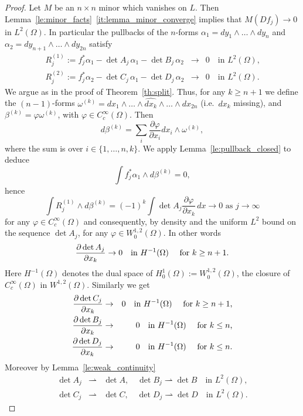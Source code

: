 \documentclass[titlepage]{amsart}
\numberwithin{equation}{section}
\theoremstyle{plain}
\theoremstyle{definition}
\theoremstyle{remark}
\begin{document}
\begin{proof} Let $M$ be an $n \times n$ minor which vanishes on $L$. Then 
Lemma~\ref{le:minor_facts}~\eqref{it:lemma_minor_converge} implies that 
$M(Df_j) \to 0$ in $L^2(\Omega)$. In particular the pullbacks of the $n$-forms 
$\alpha_1 = dy_1 \wedge \ldots \wedge dy_n$ and 
$\alpha_2 = dy_{n+1} \wedge \ldots \wedge dy_{2n}$ satisfy
\begin{eqnarray*}
 R^{(1)}_j := f_j^* \alpha_1 - \det A_j \,  \alpha_1 - \det B_j \,  \alpha_2 &\to& 0 \quad \text{in $L^2(\Omega)$,} \\
 R^{(2)}_j := f_j^* \alpha_2 - \det C_j \,  \alpha_1 - \det D_j \,  \alpha_2 &\to& 0 \quad \text{in $L^2(\Omega)$.}
 \end{eqnarray*}
 We argue as in the proof of Theorem~\ref{th:split}. Thus, for any $k\geq n+1$ we define the $(n-1)$-forms $\omega^{(k)}=dx_1\wedge\dots\wedge\widehat{dx_k}\wedge\dots\wedge dx_{2n}$ (i.e.~$dx_{k}$ missing), and $\beta^{(k)}=\varphi\omega^{(k)}$, with $\varphi\in C_c^\infty(\Omega)$. Then 
 $$
 d\beta^{(k)}=\sum_i\frac{\partial\varphi}{\partial x_i}dx_i\wedge\omega^{(k)},
 $$
 where the sum is over $i\in\{1,\dots,n,k\}$. We apply Lemma~\ref{le:pullback_closed} to deduce 
 $$
 \int f_j^*\alpha_1\wedge d\beta^{(k)}=0,
 $$
 hence
 $$
\int R_j^{(1)}\wedge d\beta^{(k)}=(-1)^k\int \det A_j\frac{\partial\varphi}{\partial x_k}\,dx\to 0\textrm{ as }j\to\infty
 $$
 for any $\varphi\in C_c^\infty(\Omega)$ and consequently, by density and the uniform $L^2$ bound on the sequence $\det A_j$, for any 
 $\varphi \in W^{1,2}_0(\Omega)$. 
 In other words
 \begin{equation}  \label{eq:H-1_A}
 \frac{\partial \det A_j}{\partial x_k} \to 0 \quad \text{in $H^{-1}(\Omega)$ \quad  for $k \ge n+1$.}
 \end{equation} 
 Here $H^{-1}(\Omega)$ denotes the  dual space of $H^1_0(\Omega) := W^{1,2}_0(\Omega)$, the closure of $C_c^\infty(\Omega)$
 in $W^{1,2}(\Omega)$. 
 Similarly we get
\begin{eqnarray}
 \frac{\partial \det C_j}{\partial x_k}  &\to& 0 \quad \text{in $H^{-1}(\Omega)$ \quad  for $k \ge n+1$,} \\
  \frac{\partial \det B_j}{\partial x_k}  &\to& 0 \quad \text{in $H^{-1}(\Omega)$ \quad  for $k \le n$,}\\
   \frac{\partial \det D_j}{\partial x_k}  &\to& 0 \quad \text{in $H^{-1}(\Omega)$ \quad  for $k \le n$.}   \label{eq:H-1_D}
 \end{eqnarray}
 Moreover by Lemma~\ref{le:weak_continuity} 
 \begin{eqnarray} 
  \det A_j  &\rightharpoonup& \det A, \quad  \det B_j  \rightharpoonup \det B \quad \text{in $L^2(\Omega)$,}   \label{eq:weak_detA} \\
 \det C_j  &\rightharpoonup& \det C, \quad  \det D_j  \rightharpoonup \det D \quad \text{in $L^2(\Omega)$.} \label{eq:weak_detD} 
 \end{eqnarray}
 

\end{proof}
\end{document}
